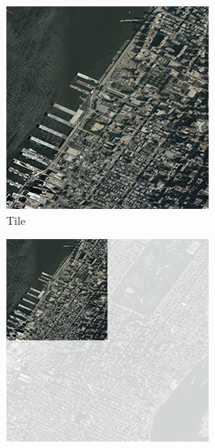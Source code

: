 \begin{figure}[htbp]
    \centering
    \begin{subfigure}[t]{0.3\textwidth}
        \includegraphics[width=\textwidth]{figures/implementation/chunktile/chunktilepile3.png}
        \caption{Tile}
    \end{subfigure}
    \quad
    \begin{subfigure}[t]{0.3\textwidth}
        \includegraphics[width=\textwidth]{figures/implementation/chunktile/chunktilepile2.png}

\end{subfigure}
\end{figure}

